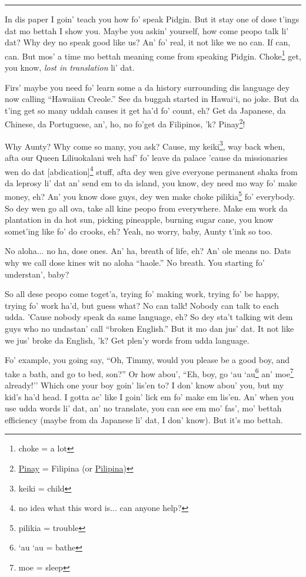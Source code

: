 \documentclass[12pt]{article}%
\begin{document}
\vspace{5mm}
\hrule

\begin{multicols}{2}
In dis paper I goin' teach you how fo' speak Pidgin. But it stay one of dose t'ings dat mo bettah I show you. Maybe you askin' yourself, how come peopo talk li' dat? Why dey no speak good like us? An' fo' real, it not like we no can. If can, can. But mos' a time mo bettah meaning come from speaking Pidgin. Choke\footnote{choke = a lot} get, you know, {\em lost in translation} li' dat.

Firs' maybe you need fo' learn some a da history surrounding dis language dey now calling ``Hawaiian Creole.'' See da buggah started in Hawai`i, no joke. But da t'ing get so many uddah causes it get ha'd fo' count, eh? Get da Japanese, da Chinese, da Portuguese, an', ho, no fo'get da Filipinos, 'k? Pinay\footnote{\href{http://en.wikipedia.org/wiki/Pinoy}{Pinay} = Filipina (or \href{http://globalnation.inquirer.net/80871/why-filipino-americans-say-pilipino-not-filipino/}{Pilipina})}!

Why Aunty? Why come so many, you ask? Cause, my keiki\footnote{keiki = child}, way back when, afta our Queen Liliuokalani weh haf' fo' leave da palace 'cause da missionaries wen do dat [abdication]\footnote{no idea what this word is... can anyone help?} stuff, afta dey wen give everyone permanent shaka from da leprosy li' dat an' send em to da island, you know, dey need mo way fo' make money, eh? An' you know dose guys, dey wen make choke pilikia\footnote{pilikia = trouble} fo' everybody. So dey wen go all ova, take all kine peopo from everywhere. Make em work da plantation in da hot sun, picking pineapple, burning sugar cane, you know somet'ing like fo' do crooks, eh? Yeah, no worry, baby, Aunty t'ink so too. 

No aloha... no ha, dose ones. An' ha, breath of life, eh? An' ole means no. Dats why we call dose kines wit no aloha ``haole.'' No breath. You starting fo' understan', baby?

So all dese peopo come toget'a, trying fo' making work, trying fo' be happy, trying fo' work ha'd, but guess what? No can talk! Nobody can talk to each udda. 'Cause nobody speak da same language, eh? So dey sta't talking wit dem guys who no undastan' call ``broken English.'' But it mo dan jus' dat. It not like we jus' broke da English, 'k? Get plen'y words from udda language. 

Fo' example, you going say, ``Oh, Timmy, would you please be a good boy, and take a bath, and go to bed, son?'' Or how abou', ``Eh, boy, go `au `au\footnote{`au `au = bathe} an' moe\footnote{moe = sleep} already!'' Which one your boy goin' lis'en to? I don' know abou' you, but my kid's ha'd head. I gotta ac' like I goin' lick em fo' make em lis'en. An' when you use udda words li' dat, an' no translate, you can see em mo' fas', mo' bettah efficiency (maybe from da Japanese li' dat, I don' know). But it's mo bettah.


\end{multicols}
\end{document}

